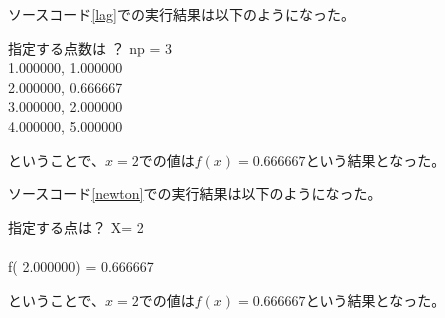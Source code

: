 \documentclass[a4paper,11pt,dvipdfmx]{jsarticle}
\begin{document}
ソースコード\ref{lag}での実行結果は以下のようになった。
\begin{shaded}
    \noindent
    指定する点数は ？ np = 3\\
    1.000000,   1.000000\\
    2.000000,   0.666667\\
    3.000000,   2.000000\\
    4.000000,   5.000000
\end{shaded}
ということで、$x=2$での値は$f(x)=0.666667$という結果となった。

ソースコード\ref{newton}での実行結果は以下のようになった。
\begin{shaded}
    \noindent
    指定する点は？ X= 2\\
    \\
    f(  2.000000) =   0.666667
\end{shaded}
ということで、$x=2$での値は$f(x)=0.666667$という結果となった。
\end{document}
